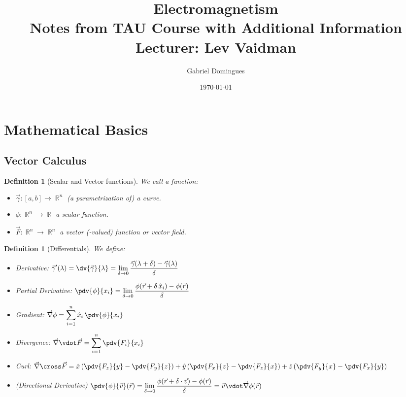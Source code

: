 \documentclass[12pt]{article}
\title{%
  Electromagnetism \\
  \large Notes from TAU Course with Additional Information\\
  Lecturer: Lev Vaidman
}
\author{Gabriel Domingues}
\date{\today}
\renewcommand{\grad}{\vec{\nabla}}
\renewcommand{\div}{\vec{\nabla}\vdot}
\renewcommand{\curl}{\vec{\nabla}\cross}
\DeclareMathOperator{\R}{\mathbb{R}}
\newcommand*{\rv}{\vec{r}}
\newcommand*{\vF}{\vec{F}}
\newcommand*{\gv}{\vec{\gamma}}
\newtheorem{definition}[theorem]{Definition}
\begin{document}
\maketitle

\tableofcontents

\doclicenseThis

\pagebreak

\section{Mathematical Basics}

\subsection{Vector Calculus}

\begin{definition}[Scalar and Vector functions]
  We call a function:
  \begin{itemize}
    \item $\gv:[a,b]\to\R^n$ (a parametrization of) a curve.
    \item $\phi:\R^n\to\R$ a scalar function.
    \item $\vF:\R^n\to\R^n$ a vector (-valued) function or vector field.
  \end{itemize}
\end{definition}

\begin{definition}[Differentials]
  We define:\begin{itemize}
    \item Derivative: $\displaystyle \gv'(\lambda)=\dv{\gv}{\lambda}=\lim_{\delta\to 0}\frac{\gv(\lambda+\delta)-\gv(\lambda)}{\delta}$
    \item Partial Derivative: $\displaystyle \pdv{\phi}{x_i}=\lim_{\delta\to 0}\frac{\phi(\rv+\delta\,\hat{x}_i)-\phi(\rv)}{\delta}$
    \item Gradient: $\displaystyle \grad\phi=\sum_{i=1}^n \hat{x}_i\,\pdv{\phi}{x_i}$
    \item Divergence: $\displaystyle \div\vF=\sum_{i=1}^n \pdv{F_i}{x_i}$
    \item Curl: $\displaystyle \curl\vF=\hat{x}\left(\pdv{F_z}{y}-\pdv{F_y}{z}\right)+\hat{y}\left(\pdv{F_x}{z}-\pdv{F_z}{x}\right)+\hat{z}\left(\pdv{F_y}{x}-\pdv{F_x}{y}\right)$
    \item (Directional Derivative) $\displaystyle \pdv{\phi}{\vec{v}}(\rv)=\lim_{\delta\to 0}\frac{\phi(\rv+\delta\cdot\vec{v})-\phi(\rv)}{\delta}=\vec{v}\vdot \grad\phi(\rv)$
  \end{itemize}
\end{definition}
\end{document}
